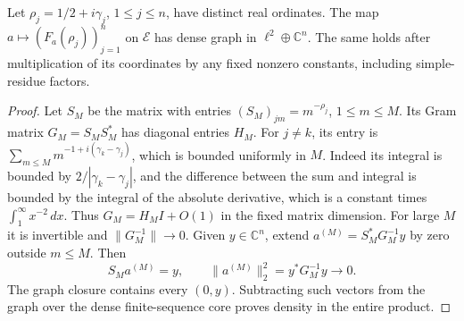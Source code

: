 \begin{proposition}
\label{mo:finite-occupation-graph}
Let $\rho_j=1/2+i\gamma_j$, $1\leq j\leq n$, have distinct
real ordinates. The map
$a\mapsto(F_a(\rho_j))_{j=1}^n$ on $\mathscr E$ has dense graph
in $\ell^2\oplus\mathbb C^n$. The same holds after multiplication
of its coordinates by any fixed nonzero constants, including
simple-residue factors.
\end{proposition}
\begin{proof}
Let $S_M$ be the matrix with entries $(S_M)_{jm}=m^{-\rho_j}$,
$1\leq m\leq M$. Its Gram matrix $G_M=S_MS_M^*$ has diagonal
entries $H_M$. For $j\ne k$, its entry is
$\sum_{m\leq M}m^{-1+i(\gamma_k-\gamma_j)}$, which is bounded
uniformly in $M$. Indeed its integral is bounded by
$2/|\gamma_k-\gamma_j|$, and the difference between the sum and
integral is bounded by the integral of the absolute derivative,
which is a constant times $\int_1^\infty x^{-2}\,dx$.
Thus $G_M=H_MI+O(1)$ in the fixed matrix dimension. For large $M$
it is invertible and $\|G_M^{-1}\|\to0$.
Given $y\in\mathbb C^n$, extend
$a^{(M)}=S_M^*G_M^{-1}y$ by zero outside $m\leq M$. Then
\[
 S_Ma^{(M)}=y,\qquad
 \|a^{(M)}\|_2^2=y^*G_M^{-1}y\longrightarrow0.
\]
The graph closure contains every $(0,y)$. Subtracting such
vectors from the graph over the dense finite-sequence core proves
density in the entire product.
\end{proof}

